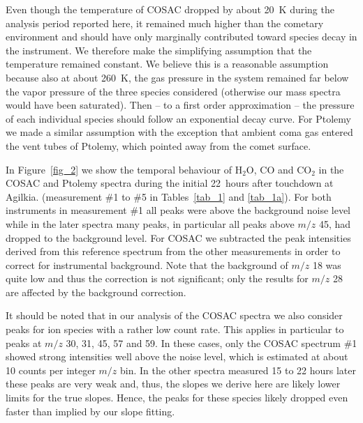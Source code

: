 \documentclass{aa}
\begin{document}
Even though the temperature of COSAC dropped by about 20~K during the analysis period reported here, it remained much higher than the cometary environment and should have only marginally contributed toward species decay in the instrument. We therefore make the simplifying assumption
that the temperature remained constant. We believe this is a 
reasonable assumption because also at about 260~K, the gas pressure in the system remained far 
below the vapor pressure of the three species considered  (otherwise our mass spectra would have been 
saturated). Then 
 -- to a first order approximation --
the pressure of each individual species should follow an exponential decay curve. 
For Ptolemy we made a similar assumption with the exception that ambient coma gas entered the vent 
tubes of Ptolemy, which pointed away from the comet surface. 

In Figure~\ref{fig_2} we show the temporal behaviour of $\mathrm{H_2O}$, CO and 
$\mathrm{CO_2}$ in the COSAC and Ptolemy spectra during the initial 
22~hours after touchdown at Agilkia. 
(measurement \#1 to \#5 in Tables~\ref{tab_1} and \ref{tab_1a}).  For both instruments in measurement \#1 all peaks 
were above the background noise level while in the later spectra many peaks, in particular all peaks above 
$m/z$ 45, had dropped to the background level. 
For COSAC we subtracted the peak intensities derived from this reference spectrum from 
the other measurements in order to correct for instrumental background.  Note that the 
background of $m/z$ 18 was quite low and thus the correction is not significant; 
only the results for $m/z$ 28 are affected by the background correction. 

It should be noted that in our analysis of the COSAC spectra we also consider peaks for ion species with a rather low count 
rate. This
applies in particular to peaks at $m/z$ 30, 31, 45, 57 and 59. In these cases, only the COSAC spectrum \#1 showed 
 strong intensities well above the noise level, which
is estimated at about 10 counts per integer $m/z$ bin. In the other spectra measured 15 to 22 hours later 
these peaks are very weak and, thus, the slopes we derive here are likely
 lower limits for the true slopes. Hence, the peaks for these species likely dropped even faster than implied by our slope
 fitting. 
 
\end{document}
